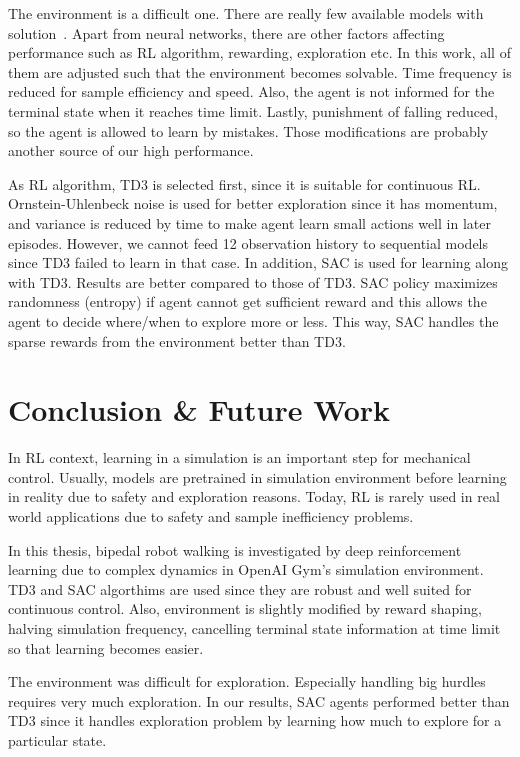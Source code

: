 \documentclass[a4paper, 12pt]{article} %
\begin{document}
The environment is a difficult one. 
There are really few available models with solution~\cite{noauthor_gymleaderboard_2021}. 
Apart from neural networks, there are other factors affecting performance such as RL algorithm, rewarding, exploration etc. 
In this work, all of them are adjusted such that the environment becomes solvable. 
Time frequency is reduced for sample efficiency and speed. 
Also, the agent is not informed for the terminal state when it reaches time limit. 
Lastly, punishment of falling reduced, so the agent is allowed to learn by mistakes. 
Those modifications are probably another source of our high performance. 

As RL algorithm, TD3 is selected first, since it is suitable for continuous RL. 
Ornstein-Uhlenbeck noise is used for better exploration since it has momentum, and variance is reduced by time to make agent learn small actions well in later episodes. 
However, we cannot feed 12 observation history to sequential models since TD3 failed to learn in that case.
In addition, SAC is used for learning along with TD3. 
Results are better compared to those of TD3. 
SAC policy maximizes randomness (entropy) if agent cannot get sufficient reward and this allows the agent to decide where/when to explore more or less. 
This way, SAC handles the sparse rewards from the environment better than TD3. 

\section{Conclusion \& Future Work}

In RL context, learning in a simulation is an important step for mechanical control. 
Usually, models are pretrained in simulation environment before learning in reality due to safety and exploration reasons. 
Today, RL is rarely used in real world applications due to safety and sample inefficiency problems. 

In this thesis, bipedal robot walking is investigated by deep  reinforcement learning due to complex dynamics in OpenAI Gym's simulation environment. 
TD3 and SAC algorthims are used since they are robust and well suited for continuous control. 
Also, environment is slightly modified by reward shaping, halving simulation frequency, cancelling terminal state information at time limit so that learning becomes easier.

The environment was difficult for exploration. 
Especially handling big hurdles requires very much exploration.
In our results, SAC agents performed better than TD3 since it handles exploration problem by learning how much to explore for a particular state. 
\end{document}
